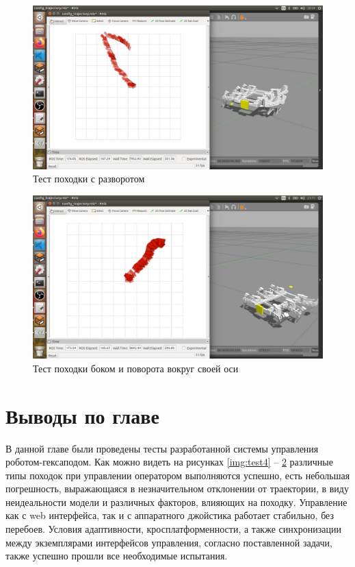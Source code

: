 \begin{figure}[h!]
	\centering
	\includegraphics[width = \linewidth]{img/test6}
	\caption{Тест походки с разворотом}
	\label{img:test6}
\end{figure}

\begin{figure}[h!]
	\centering
	\includegraphics[width = \linewidth]{img/test7}
	\caption{Тест походки боком и поворота вокруг своей оси}
	\label{img:test7}
\end{figure}

\clearpage
\section {Выводы по главе}

В данной главе были проведены тесты разработанной системы управления роботом-гексаподом. Как можно видеть на рисунках \ref{img:test4} – \ref{img:test7} различные типы походок при управлении оператором выполняются успешно, есть небольшая погрешность, выражающаяся в незначительном отклонении от траектории, в виду неидеальности модели и различных факторов, влияющих на походку. Управление как с web интерфейса, так и с аппаратного джойстика работает стабильно, без перебоев. Условия адаптивности, кросплатформенности, а также синхронизации между экземплярами интерфейсов управления, согласно поставленной задачи, также успешно прошли все необходимые испытания.